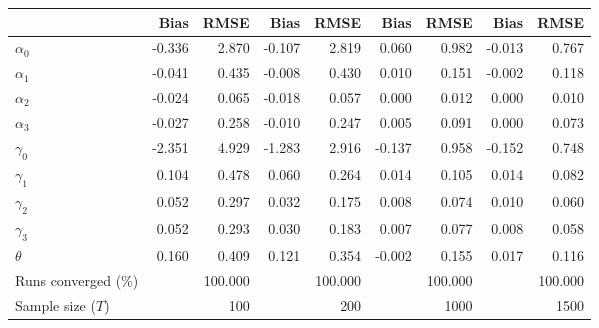 
\begin{tabular}[t]{lrrrrrrrr}
\toprule
  & Bias & RMSE & Bias & RMSE & Bias & RMSE & Bias & RMSE\\
\midrule
$\alpha_{0}$ & -0.336 & 2.870 & -0.107 & 2.819 & 0.060 & 0.982 & -0.013 & 0.767\\
$\alpha_{1}$ & -0.041 & 0.435 & -0.008 & 0.430 & 0.010 & 0.151 & -0.002 & 0.118\\
$\alpha_{2}$ & -0.024 & 0.065 & -0.018 & 0.057 & 0.000 & 0.012 & 0.000 & 0.010\\
$\alpha_{3}$ & -0.027 & 0.258 & -0.010 & 0.247 & 0.005 & 0.091 & 0.000 & 0.073\\
$\gamma_{0}$ & -2.351 & 4.929 & -1.283 & 2.916 & -0.137 & 0.958 & -0.152 & 0.748\\
$\gamma_{1}$ & 0.104 & 0.478 & 0.060 & 0.264 & 0.014 & 0.105 & 0.014 & 0.082\\
$\gamma_{2}$ & 0.052 & 0.297 & 0.032 & 0.175 & 0.008 & 0.074 & 0.010 & 0.060\\
$\gamma_{3}$ & 0.052 & 0.293 & 0.030 & 0.183 & 0.007 & 0.077 & 0.008 & 0.058\\
$\theta$ & 0.160 & 0.409 & 0.121 & 0.354 & -0.002 & 0.155 & 0.017 & 0.116\\
Runs converged (\%) &  & 100.000 &  & 100.000 &  & 100.000 &  & 100.000\\
Sample size ($T$) &  & 100 &  & 200 &  & 1000 &  & 1500\\
\bottomrule
\end{tabular}
